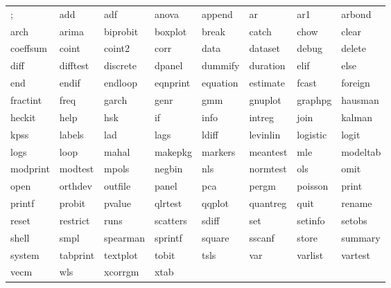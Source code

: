\begin{tabular}{llllllll}
; & add & adf & anova & append & ar & ar1 & arbond \\
arch & arima & biprobit & boxplot & break & catch & chow & clear \\
coeffsum & coint & coint2 & corr & data & dataset & debug & delete \\
diff & difftest & discrete & dpanel & dummify & duration & elif & else \\
end & endif & endloop & eqnprint & equation & estimate & fcast & foreign \\
fractint & freq & garch & genr & gmm & gnuplot & graphpg & hausman \\
heckit & help & hsk & if & info & intreg & join & kalman \\
kpss & labels & lad & lags & ldiff & levinlin & logistic & logit \\
logs & loop & mahal & makepkg & markers & meantest & mle & modeltab \\
modprint & modtest & mpols & negbin & nls & normtest & ols & omit \\
open & orthdev & outfile & panel & pca & pergm & poisson & print \\
printf & probit & pvalue & qlrtest & qqplot & quantreg & quit & rename \\
reset & restrict & runs & scatters & sdiff & set & setinfo & setobs \\
shell & smpl & spearman & sprintf & square & sscanf & store & summary \\
system & tabprint & textplot & tobit & tsls & var & varlist & vartest \\
vecm & wls & xcorrgm & xtab & \\
\end{tabular}


